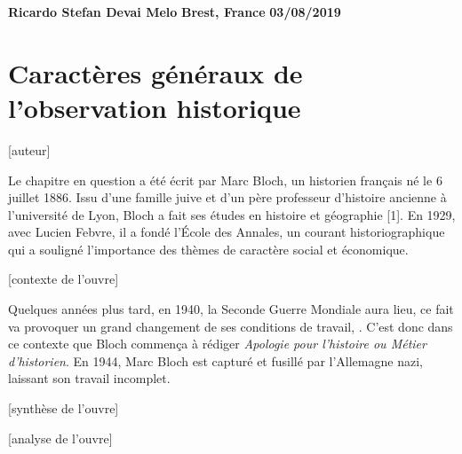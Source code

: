 \documentclass[12pt]{article}
\begin{document}
\begin{flushright}
  \textbf{Ricardo Stefan Devai Melo}
  \linebreak
  \textbf{Brest, France}
  \linebreak
  \textbf{03/08/2019}
  \linebreak
\end{flushright}


\section*{Caractères généraux de l'observation historique}
[auteur]

Le chapitre en question a été écrit par Marc Bloch, un historien français né le 6 juillet 1886. Issu d'une famille juive et d'un père professeur d'histoire ancienne à l'université de Lyon, Bloch a fait ses études en histoire et géographie [1]. En 1929, avec Lucien Febvre, il a fondé l'École des Annales, un courant historiographique qui a souligné l'importance des thèmes de caractère social et économique.

[contexte de l'ouvre]

Quelques années plus tard, en 1940, la Seconde Guerre Mondiale aura lieu, ce fait va provoquer un grand changement de ses conditions de travail, . C'est donc dans ce contexte que Bloch commença à rédiger \emph{Apologie pour l'histoire ou Métier d'historien}. En 1944, Marc Bloch est capturé et fusillé par l'Allemagne nazi, laissant son travail incomplet.

[synthèse de l'ouvre]

[analyse de l'ouvre]
\end{document}
